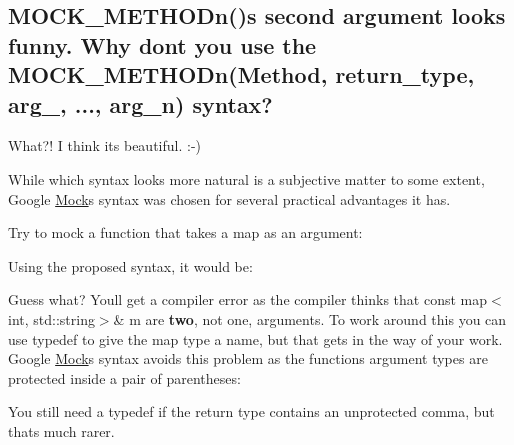 \subsection*{M\+O\+C\+K\+\_\+\+M\+E\+T\+H\+O\+Dn()\textquotesingle{}s second argument looks funny. Why don\textquotesingle{}t you use the M\+O\+C\+K\+\_\+\+M\+E\+T\+H\+O\+Dn(\+Method, return\+\_\+type, arg\+\_, ..., arg\+\_\+n) syntax?}

What?! I think it\textquotesingle{}s beautiful. \+:-\/)

While which syntax looks more natural is a subjective matter to some extent, Google \mbox{\hyperlink{class_mock}{Mock}}\textquotesingle{}s syntax was chosen for several practical advantages it has.

Try to mock a function that takes a map as an argument\+: 
\begin{DoxyCode}{0}
\end{DoxyCode}


Using the proposed syntax, it would be\+: 
\begin{DoxyCode}{0}
\end{DoxyCode}


Guess what? You\textquotesingle{}ll get a compiler error as the compiler thinks that {\ttfamily const map$<$int, std\+::string$>$\& m} are {\bfseries{two}}, not one, arguments. To work around this you can use {\ttfamily typedef} to give the map type a name, but that gets in the way of your work. Google \mbox{\hyperlink{class_mock}{Mock}}\textquotesingle{}s syntax avoids this problem as the function\textquotesingle{}s argument types are protected inside a pair of parentheses\+: 
\begin{DoxyCode}{0}
\end{DoxyCode}


You still need a {\ttfamily typedef} if the return type contains an unprotected comma, but that\textquotesingle{}s much rarer.

